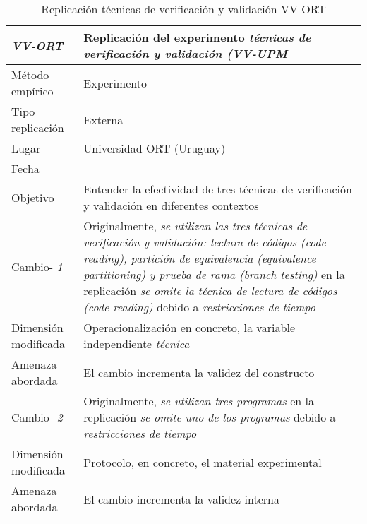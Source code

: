 
\begin{table}
\caption{Replicación técnicas de verificación y validación VV-ORT}
\begin{tabular}{| p{3.3cm} | p{9cm} |}
\hline

\textbf {\textit{VV-ORT}} & Replicación del experimento \textit{técnicas de verificación y validación (VV-UPM }    \\  \hline

Método empírico &  Experimento   \\  \hline
Tipo replicación &  Externa   \\  \hline
Lugar & Universidad ORT (Uruguay) \\  \hline
Fecha &     \\  \hline
Objetivo  &  Entender la efectividad de tres técnicas de verificación y validación en diferentes contextos \\  \hline \hline

Cambio- \textit{1}   & \parbox[t]{9cm} {Originalmente,  \textit{ se utilizan las tres técnicas de verificación y validación: lectura de códigos (code reading), partición de equivalencia (equivalence partitioning) y prueba de rama (branch testing) } } \parbox[t]{9cm}{en la replicación \textit{ se omite la técnica de lectura de códigos (code reading)  } }  debido a  \textit{restricciones de tiempo } \\  \hline
Dimensión modificada & 
Operacionalización en concreto, la variable independiente \textit {técnica} \\  \hline 
Amenaza abordada  & El cambio incrementa la validez del constructo  \\  \hline \hline

Cambio- \textit{2}   & \parbox[t]{9cm} {Originalmente,  \textit{ se utilizan tres programas } } \parbox[t]{9cm}{en la replicación \textit{ se omite uno de los programas } }  debido a  \textit{restricciones de tiempo } \\  \hline
Dimensión modificada & 
Protocolo, en concreto, el material experimental \\  \hline 
Amenaza abordada  & El cambio incrementa la validez interna  \\  \hline \hline


\end{tabular}
\end{table}
